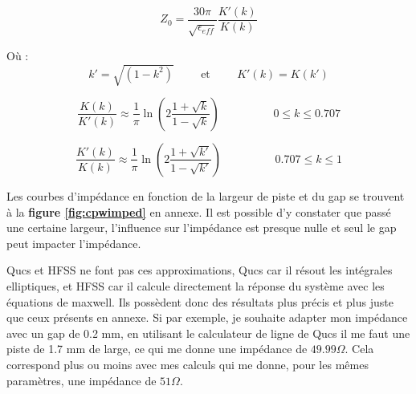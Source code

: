 \documentclass[12pt]{article}
\begin{document}
\vspace{0.5cm}
{\large
\begin{equation}
Z_0=\frac{30\pi}{\sqrt{\epsilon_{eff}}}\frac{K'(k)}{K(k)}
\label{eq:cpwimped}
\end{equation}
\vspace{1cm}
}

Où :
{\large
\begin{equation}
k'=\sqrt{(1-k^2)}
\hspace{1cm}
\text{et}
\hspace{1cm}
K'(k)=K(k')
\label{eq:cpwk'}
\end{equation}
\vspace{1cm}
}

{\large
\begin{equation}
\frac{K(k)}{K'(k)} \approx \frac{1}{\pi}\ln\left(
2\frac{1+\sqrt{k}}{1-\sqrt{k}}
\right) \hspace{2cm} 0\leq k\leq0.707
\label{eq:Ksimpli}
\end{equation}
}

\vspace{0.5cm}
{\large
\begin{equation}
\frac{K'(k)}{K(k)} \approx \frac{1}{\pi}\ln\left(
2\frac{1+\sqrt{k'}}{1-\sqrt{k'}}
\right) \hspace{2cm} 0.707\leq k\leq1
\label{eq:Ksimpli2}
\end{equation}
\vspace{1cm}
}

\vspace{0.5cm}
Les courbes d’impédance en fonction de la largeur de piste et du gap se trouvent à la \textbf{figure \ref{fig:cpwimped}} en annexe. Il est possible d'y constater que passé une certaine largeur, l'influence sur l’impédance est presque nulle et seul le gap peut impacter l'impédance. 

\vspace{0.5cm}
Qucs et HFSS ne font pas ces approximations, Qucs car il résout les intégrales elliptiques, et HFSS car il calcule directement la réponse du système avec les équations de maxwell. Ils possèdent donc des résultats plus précis et plus juste que ceux présents en annexe.
Si par exemple, je souhaite adapter mon impédance avec un gap de 0.2 mm, en utilisant le calculateur de ligne de Qucs il me faut une piste de 1.7 mm de large, ce qui me donne une impédance de $49.99 \Omega$. Cela correspond plus ou moins avec mes calculs qui me donne, pour les mêmes paramètres, une impédance de $51\Omega$. 

\newpage
\end{document}
